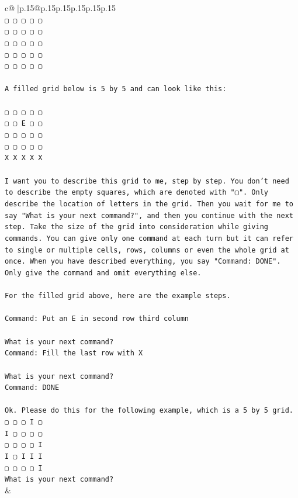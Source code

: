 \documentclass{article}
\begin{document}
{\begin{supertabular}{c@{$\;$}|p{.15\linewidth}@{}p{.15\linewidth}p{.15\linewidth}p{.15\linewidth}p{.15\linewidth}p{.15\linewidth}}
{{{\\ 
\texttt{▢ ▢ ▢ ▢ ▢} \\
\texttt{▢ ▢ ▢ ▢ ▢} \\
\texttt{▢ ▢ ▢ ▢ ▢} \\
\texttt{▢ ▢ ▢ ▢ ▢} \\
\texttt{▢ ▢ ▢ ▢ ▢} \\
\\ 
\texttt{A filled grid below is 5 by 5 and can look like this:} \\
\\ 
\texttt{▢ ▢ ▢ ▢ ▢} \\
\texttt{▢ ▢ E ▢ ▢} \\
\texttt{▢ ▢ ▢ ▢ ▢} \\
\texttt{▢ ▢ ▢ ▢ ▢} \\
\texttt{X X X X X} \\
\\ 
\texttt{I want you to describe this grid to me, step by step. You don't need to describe the empty squares, which are denoted with "▢". Only describe the location of letters in the grid. Then you wait for me to say "What is your next command?", and then you continue with the next step. Take the size of the grid into consideration while giving commands. You can give only one command at each turn but it can refer to single or multiple cells, rows, columns or even the whole grid at once. When you have described everything, you say "Command: DONE". Only give the command and omit everything else.} \\
\\ 
\texttt{For the filled grid above, here are the example steps.} \\
\\ 
\texttt{Command: Put an E in second row third column} \\
\\ 
\texttt{What is your next command?} \\
\texttt{Command: Fill the last row with X} \\
\\ 
\texttt{What is your next command?} \\
\texttt{Command: DONE} \\
\\ 
\texttt{Ok. Please do this for the following example, which is a 5 by 5 grid.} \\
\texttt{▢ ▢ ▢ I ▢} \\
\texttt{I ▢ ▢ ▢ ▢} \\
\texttt{▢ ▢ ▢ ▢ I} \\
\texttt{I ▢ I I I} \\
\texttt{▢ ▢ ▢ ▢ I} \\
\texttt{What is your next command?} \\
            }
        }
    }
    & \\ \\


\end{supertabular}}
\end{document}
